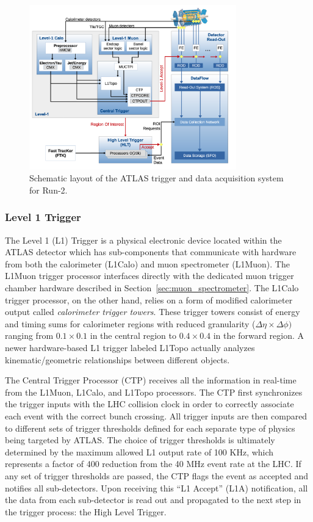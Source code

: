 \begin{figure}
	\centering
	\includegraphics[width=0.8\textwidth]{atlas_trigger_system}
	\caption{Schematic layout of the ATLAS trigger and data acquisition system for Run-2. \cite{Ruiz-Martinez:2133909}}
	\label{fig:trigger_system}
\end{figure}

\subsubsection{Level 1 Trigger}
The Level 1 (L1) Trigger is a physical electronic device located within the ATLAS detector which has sub-components that communicate with hardware from both the calorimeter (L1Calo) and muon spectrometer (L1Muon).
The L1Muon trigger processor interfaces directly with the dedicated muon trigger chamber hardware described in Section~\ref{sec:muon_spectrometer}.
The L1Calo trigger processor, on the other hand, relies on a form of modified calorimeter output called \textit{calorimeter trigger towers}.
These trigger towers consist of energy and timing sums for calorimeter regions with reduced granularity ($\Delta \eta \times \Delta \phi)$ ranging from $0.1 \times 0.1$ in the central region to $0.4 \times 0.4$ in the forward region.
A newer hardware-based L1 trigger labeled L1Topo actually analyzes kinematic/geometric relationships between different objects.

The Central Trigger Processor (CTP) receives all the information in real-time from the L1Muon, L1Calo, and L1Topo processors.
The CTP first synchronizes the trigger inputs with the LHC collision clock in order to correctly associate each event with the correct bunch crossing.
All trigger inputs are then compared to different sets of trigger thresholds defined for each separate type of physics being targeted by ATLAS.
The choice of trigger thresholds is ultimately determined by the maximum allowed L1 output rate of 100 KHz, which represents a factor of 400 reduction from the 40 MHz event rate at the LHC.
If any set of trigger thresholds are passed, the CTP flags the event as accepted and notifies all sub-detectors.
Upon receiving this ``L1 Accept'' (L1A) notification, all the data from each sub-detector is read out and propagated to the next step in the trigger process: the High Level Trigger.

